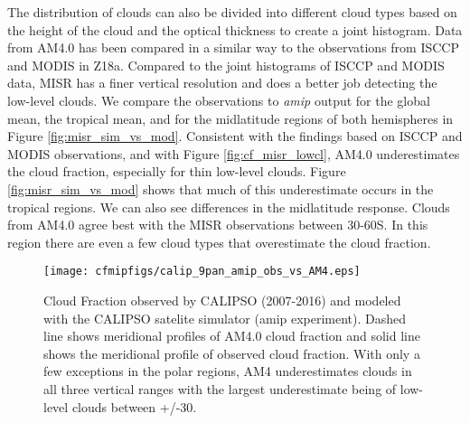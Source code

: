 \documentclass[draft]{agujournal2019}
\begin{document}
The distribution of clouds can also be divided into different cloud types based on the height of the cloud and
the optical thickness to create a joint histogram.  
Data from AM4.0 has been compared in a similar way to the observations from ISCCP and MODIS in Z18a.  
Compared to the joint histograms of ISCCP and MODIS data, MISR has a finer
vertical resolution and does a better job detecting the low-level clouds.  We compare the observations to 
\textit{amip} output for the global mean, the tropical mean, and for the midlatitude regions of both hemispheres 
in Figure \ref{fig:misr_sim_vs_mod}.
Consistent with the findings based on ISCCP and MODIS observations, and with Figure \ref{fig:cf_misr_lowcl},
AM4.0 underestimates the cloud fraction, especially for thin low-level clouds.  Figure \ref{fig:misr_sim_vs_mod}
shows that much of this underestimate occurs in the tropical regions.  We can also see differences in the
midlatitude response.  Clouds from AM4.0 agree best with the MISR observations between 30-60S.  In this 
region there are even a few cloud types that overestimate the cloud fraction.  

\begin{figure}
  \centering
  \texttt{[image: cfmipfigs/calip\_9pan\_amip\_obs\_vs\_AM4.eps]}
  \caption{Cloud Fraction observed by CALIPSO (2007-2016) and modeled with the CALIPSO satelite simulator 
  (amip experiment).
  Dashed line shows meridional profiles of AM4.0 cloud fraction and solid line shows
  the meridional profile of observed cloud fraction.  With only a few exceptions in the polar regions, AM4 underestimates
  clouds in all three vertical ranges with the largest underestimate being of low-level clouds between +/-30.}
  \label{fig:calipso_9pan}
\end{figure}
\end{document}
